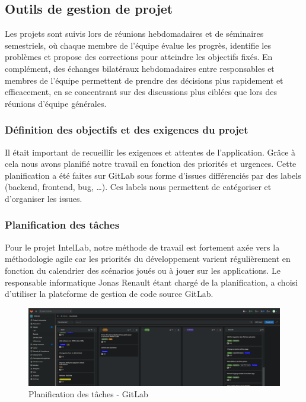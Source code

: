 \subsection{Outils de gestion de projet}

Les projets sont suivis lors de réunions hebdomadaires et de séminaires semestriels, où chaque membre de l'équipe évalue les progrès, identifie les problèmes et propose des corrections pour atteindre les objectifs fixés.
En complément, des échanges bilatéraux hebdomadaires entre responsables et membres de l'équipe permettent de prendre des décisions plus rapidement et efficacement, en se concentrant sur des discussions plus ciblées que lors des réunions d'équipe générales.

\subsubsection{Définition des objectifs et des exigences du projet}

Il était important de recueillir les exigences et attentes de l’application.
Grâce à cela nous avons planifié notre travail en fonction des priorités et urgences. Cette planification a été faites sur GitLab sous forme d’issues différenciés par des labels (backend, frontend, bug, …).
Ces labels nous permettent de catégoriser et d'organiser les issues.

\subsubsection{Planification des tâches}

Pour le projet IntelLab, notre méthode de travail est fortement axée vers la méthodologie agile car les priorités du développement varient régulièrement en fonction du calendrier des scénarios joués ou à jouer sur les applications.
Le responsable informatique Jonas Renault étant chargé de la planification, a choisi d'utiliser la plateforme de gestion de code source GitLab.

\begin{figure}[h]
	\center
	\includegraphics[width=\textwidth]{./images/gitlab_intellab.PNG}
	\caption[Planification des issues]{Planification des tâches - GitLab}\label{fig:gitlab_intellab}
\end{figure}

